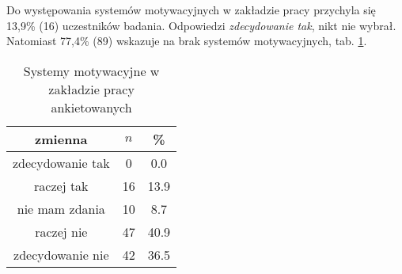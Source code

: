 

 Do występowania systemów motywacyjnych w zakładzie pracy przychyla się 13,9\% (16) uczestników badania. Odpowiedzi  \textit{zdecydowanie tak},  nikt nie wybrał. Natomiast 77,4\% (89) wskazuje na brak systemów motywacyjnych, tab. \ref{tab:Q9}.

\begin{table}[H]
\caption{Systemy motywacyjne w zakładzie pracy ankietowanych}
\centering
\begin{tabular}{ | c | c | c |}
\hline
zmienna & $n$ & \% \\
\hline
zdecydowanie tak  &  0  & 0.0\\
\hline
raczej tak  &  16  & 13.9 \\
\hline
nie mam zdania  &  10  & 8.7 \\
\hline
raczej nie  &  47  & 40.9 \\
\hline
zdecydowanie nie  &  42  & 36.5 \\
\hline
\end{tabular}
\label{tab:Q9}
\end{table}

